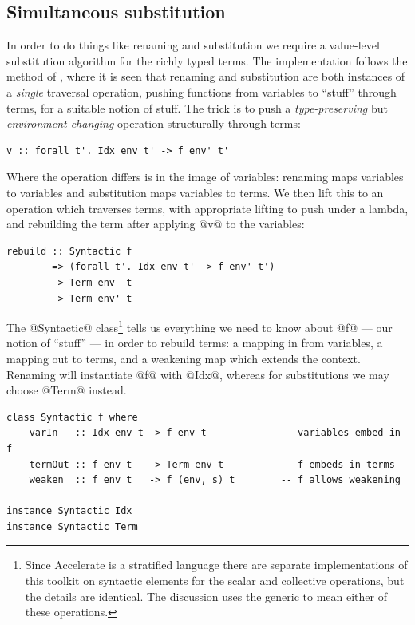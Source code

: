\subsection{Simultaneous substitution}
\label{sec:substitution}

In order to do things like renaming and substitution we require a value-level
substitution algorithm for the richly typed terms. The implementation follows
the method of \citet{McBride:2006up,McBride:2005jv}, where it is seen that
renaming and substitution are both instances of a \emph{single} traversal
operation, pushing functions from variables to ``stuff'' through terms, for a
suitable notion of stuff.
%
The trick is to push a \emph{type-preserving} but \emph{environment changing}
operation structurally through terms:
%
\begin{lstlisting}[style=haskell]
v :: forall t'. Idx env t' -> f env' t'
\end{lstlisting}

Where the operation differs is in the image of variables: renaming maps
variables to variables and substitution maps variables to terms. We then lift
this to an operation which traverses terms, with appropriate lifting to push
under a lambda, and rebuilding the term after applying @v@ to the
variables:
%
\begin{lstlisting}[style=haskell]
rebuild :: Syntactic f
        => (forall t'. Idx env t' -> f env' t')
        -> Term env  t
        -> Term env' t
\end{lstlisting}

The @Syntactic@ class\footnote{Since Accelerate is a stratified language
there are separate implementations of this toolkit on syntactic elements for the
scalar and collective operations, but the details are identical. The discussion
uses the generic  to mean either of these operations.} tells us
everything we need to know about @f@ --- our notion of ``stuff'' --- in
order to rebuild terms: a mapping in from variables, a mapping out to terms, and
a weakening map which extends the context. Renaming will instantiate @f@
with @Idx@, whereas for substitutions we may choose @Term@ instead.
%
\begin{lstlisting}[style=haskell]
class Syntactic f where
    varIn   :: Idx env t -> f env t             -- variables embed in f
    termOut :: f env t   -> Term env t          -- f embeds in terms
    weaken  :: f env t   -> f (env, s) t        -- f allows weakening

instance Syntactic Idx
instance Syntactic Term
\end{lstlisting}

